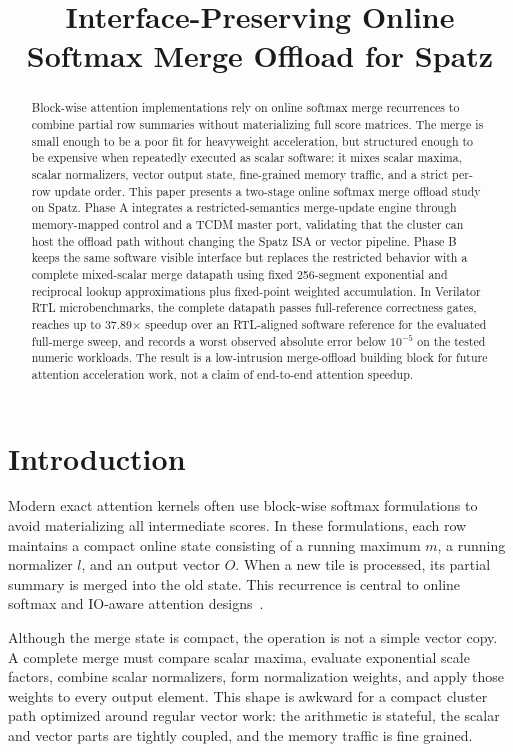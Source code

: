 \documentclass[conference]{IEEEtran}
\title{Interface-Preserving Online Softmax Merge Offload for Spatz}
\author{
  \IEEEauthorblockN{Wenxuan Tang}
  \IEEEauthorblockA{Local Spatz Prototype Study}
}
\begin{document}
\maketitle

\begin{abstract}
Block-wise attention implementations rely on online softmax merge recurrences
to combine partial row summaries without materializing full score matrices.
The merge is small enough to be a poor fit for heavyweight acceleration, but
structured enough to be expensive when repeatedly executed as scalar software:
it mixes scalar maxima, scalar normalizers, vector output state, fine-grained
memory traffic, and a strict per-row update order. This paper presents a
two-stage online softmax merge offload study on Spatz. Phase A integrates a
restricted-semantics merge-update engine through memory-mapped control and a
TCDM master port, validating that the cluster can host the offload path without
changing the Spatz ISA or vector pipeline. Phase B keeps the same software
visible interface but replaces the restricted behavior with a complete
mixed-scalar merge datapath using fixed 256-segment exponential and reciprocal
lookup approximations plus fixed-point weighted accumulation. In Verilator RTL
microbenchmarks, the complete datapath passes full-reference correctness
gates, reaches up to 37.89$\times$ speedup over an RTL-aligned software
reference for the evaluated full-merge sweep, and records a worst observed
absolute error below $10^{-5}$ on the tested numeric workloads. The result is a
low-intrusion merge-offload building block for future attention acceleration
work, not a claim of end-to-end attention speedup.
\end{abstract}

\section{Introduction}

Modern exact attention kernels often use block-wise softmax formulations to
avoid materializing all intermediate scores. In these formulations, each row
maintains a compact online state consisting of a running maximum $m$, a running
normalizer $l$, and an output vector $O$. When a new tile is processed, its
partial summary is merged into the old state. This recurrence is central to
online softmax and IO-aware attention designs~\cite{online-softmax2018,
flashattention2022}.

Although the merge state is compact, the operation is not a simple vector
copy. A complete merge must compare scalar maxima, evaluate exponential scale
factors, combine scalar normalizers, form normalization weights, and apply
those weights to every output element. This shape is awkward for a compact
cluster path optimized around regular vector work: the arithmetic is
stateful, the scalar and vector parts are tightly coupled, and the memory
traffic is fine grained.
\end{document}
